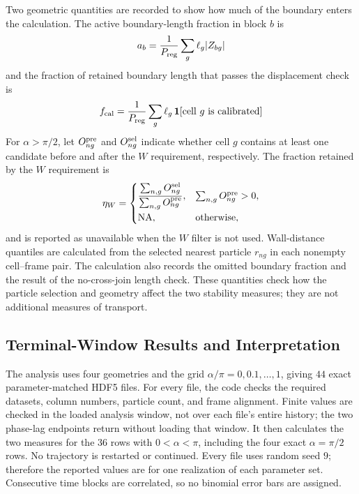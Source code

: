 \documentclass[11pt]{article}
\numberwithin{equation}{section}
\begin{document}
Two geometric quantities are recorded to show how much of the boundary enters
the calculation.  The active boundary-length fraction in block $b$ is
\begin{equation}
  a_b=\frac{1}{P_{\rm reg}}\sum_g\ell_g|Z_{bg}|
  \label{eq:active_arclength_fraction}
\end{equation}
and the fraction of retained boundary length that passes the displacement
check is
\begin{equation}
  f_{\rm cal}=\frac{1}{P_{\rm reg}}
  \sum_g\ell_g\,\mathbf 1[\text{cell $g$ is calibrated}]
  \label{eq:calibrated_perimeter_fraction}
\end{equation}
For $\alpha>\pi/2$, let $O_{ng}^{\rm pre}$ and
$O_{ng}^{\rm sel}$ indicate whether cell $g$ contains at least one candidate
before and after the $W$ requirement, respectively.  The fraction retained by
the $W$ requirement is
\begin{equation}
 \eta_W=
 \begin{cases}
 \displaystyle
 \frac{\sum_{n,g}O_{ng}^{\rm sel}}
      {\sum_{n,g}O_{ng}^{\rm pre}},
 &\sum_{n,g}O_{ng}^{\rm pre}>0,\\[0.8em]
 \mathrm{NA},&\text{otherwise},
 \end{cases}
 \label{eq:w_grid_retention}
\end{equation}
and is reported as unavailable when the $W$ filter is not used.  Wall-distance
quantiles are calculated from the selected nearest particle $r_{ng}$ in each
nonempty cell--frame pair.  The calculation also records the omitted boundary
fraction and the result of the no-cross-join length check.  These quantities
check how the particle selection and geometry affect the two stability
measures; they are not additional measures of transport.

\subsection{Terminal-Window Results and Interpretation}

The analysis uses four geometries and the grid
$\alpha/\pi=0,0.1,\ldots,1$, giving $44$ exact parameter-matched HDF5 files.
For every file, the code checks the required datasets, column numbers,
particle count, and frame alignment. Finite values are checked in the loaded
analysis window, not over each file's entire history; the two phase-lag
endpoints return without loading that window. It then calculates the two
measures for the $36$ rows with $0<\alpha<\pi$, including the four exact
$\alpha=\pi/2$ rows.  No trajectory is restarted or continued.  Every file
uses random seed $9$; therefore the reported values are for one realization of
each parameter set.  Consecutive time blocks are correlated, so no binomial
error bars are assigned.
\end{document}

